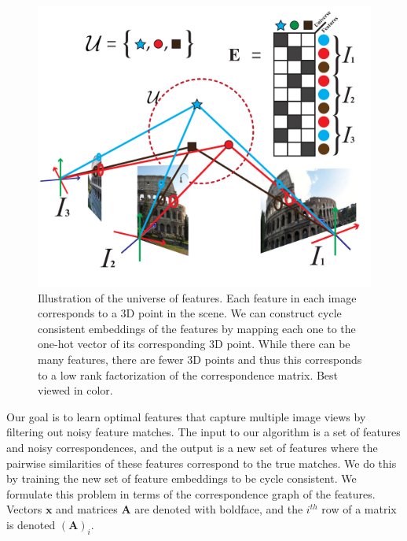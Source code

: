 \documentclass[10pt,twocolumn,letterpaper]{article}
\newcommand{\mat}[1]{\mathbf{#1}}
\begin{document}
\begin{figure}[t]
\begin{center}
  \includegraphics[width=0.9\linewidth]{figures-UniverseOfFeatures-v2.pdf}
\end{center}
  \caption{
    Illustration of the universe of features.
    Each feature in each image corresponds to a 3D point in the scene.
    We can construct cycle consistent embeddings of the features by mapping each one to the one-hot vector of its corresponding 3D point.
    While there can be many features, there are fewer 3D points and thus this corresponds to a low rank factorization of the correspondence matrix.
    Best viewed in color.
  }
\label{fig:universefeatures}
\label{fig:onecol}
\end{figure}
Our goal is to learn optimal features that capture multiple image views by filtering out noisy feature matches.
The input to our algorithm is a set of features and noisy correspondences, and the output is a new set of features where the pairwise similarities of these features correspond to the true matches.
We do this by training the new set of feature embeddings to be cycle consistent.
We formulate this problem in terms of the correspondence graph of the features.
Vectors $\mat{x}$ and matrices $\mat{A}$ are denoted with boldface, and the $i^{th}$ row of a matrix is denoted $(\mat{A})_i$.
\end{document}
